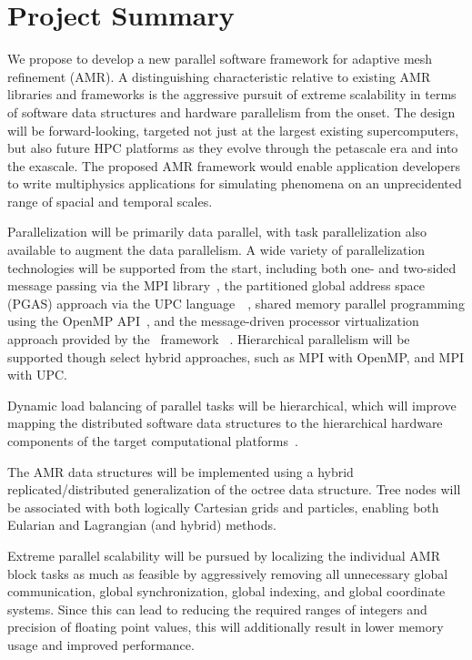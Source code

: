 \documentclass[10pt,twocolumn]{article}
\begin{document}
\section{Project Summary}  \label{s:summary}


%
We propose to develop a new parallel software framework for adaptive
mesh refinement (AMR).  
%
A distinguishing characteristic relative to existing AMR libraries and
frameworks is the aggressive pursuit of extreme scalability in terms
of software data structures and hardware parallelism from the
onset.
%
The design will be forward-looking, targeted not just at the largest
existing supercomputers, but also future HPC platforms as they evolve
through the petascale era and into the exascale.
%
The proposed AMR framework would enable application developers to
write multiphysics applications for simulating phenomena on an
unprecidented range of spacial and temporal scales.

%
Parallelization will be primarily data parallel, with task
parallelization also available to augment the data parallelism.
%
A wide variety of parallelization technologies will be supported from
the start, including both one- and two-sided message passing via the
MPI library~\cite{wwwmpi}, the partitioned global address space (PGAS)
approach via the UPC language~\cite{wwwupc}~\cite{upc}, shared memory
parallel programming using the OpenMP API~\cite{wwwopenmp}, and the
message-driven processor virtualization approach provided by the
\charm\ framework~\cite{KaBo07} \cite{wwwcharm}.
%
Hierarchical parallelism will be supported though select hybrid
approaches, such as MPI with OpenMP, and MPI with UPC.

%
Dynamic load balancing of parallel tasks will be hierarchical, which
will improve mapping the distributed software data structures to the
hierarchical hardware components of the target computational
platforms~\cite{LaTa06}.

%
The AMR data structures will be implemented using a hybrid
replicated/distributed generalization of the octree data structure.
Tree nodes will be associated with both logically Cartesian grids and
particles, enabling both Eularian and Lagrangian (and hybrid) methods.

%
Extreme parallel scalability will be pursued by localizing the
individual AMR block tasks as much as feasible by aggressively
removing all unnecessary global communication, global synchronization,
global indexing, and global coordinate systems.  Since this can lead
to reducing the required ranges of integers and precision of floating
point values, this will additionally result in lower memory usage and
improved performance.
\end{document}
